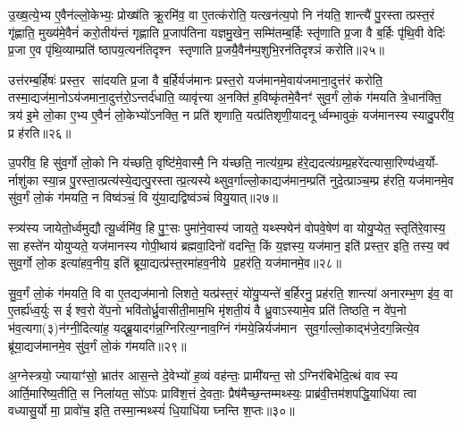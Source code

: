 उ॒ख्ष॒त्ये॒भ्य ए॒वैन॑ल्लो॒केभ्यः॒ प्रोख्ष॑ति क्रू॒रमि॑व॒ वा ए॒तत्क॑रोति॒ यत्खन॑त्य॒पो नि न॑यति॒ शान्त्यै॑ पु॒रस्तात्प्रस्त॒रं गृ॑ह्णाति॒ मुख्य॑मे॒वैनं॑ करो॒तीय॑न्तं गृह्णाति प्र॒जाप॑तिना यज्ञमु॒खेन॒ सम्मि॑तम्ब॒र्\mbox{}हिः स्तृ॑णाति प्र॒जा वै ब॒र्\mbox{}हिः पृ॑थि॒वी वेदिः॑ प्र॒जा ए॒व पृ॑थि॒व्याम्प्रति॑ ष्ठापय॒त्यन॑तिदृश्न स्तृणाति प्र॒जयै॒वैन॑म्प॒शुभि॒रन॑तिदृश्ञं करोति॥२५॥

उत्त॑रम्ब॒र्\mbox{}हिषः॑ प्रस्त॒र सा॑दयति प्र॒जा वै ब॒र्\mbox{}हिर्यज॑मानः प्रस्त॒रो यज॑मानमे॒वाय॑जमाना॒दुत्त॑रं करोति॒ तस्मा॒द्यज॑मा॒नोऽय॑जमाना॒दुत्त॑रो॒ऽन्तर्द॑धाति॒ व्यावृ॑त्त्या अ॒नक्ति॑ ह॒विष्कृ॑तमे॒वैनꣳ॑ सुव॒र्गं लो॒कं ग॑मयति त्रे॒धान॑क्ति॒ त्रय॑ इ॒मे लो॒का ए॒भ्य ए॒वैनं॑ लो॒केभ्यो॑ऽनक्ति॒ न प्रति॑ शृणाति॒ यत्प्र॑तिशृणी॒यादनूर्ध्वम्भावुकं॒ यज॑मानस्य स्यादु॒परी॑व॒ प्र ह॑रति॥२६॥

उ॒परी॑व॒ हि सु॑व॒र्गो लो॒को नि य॑च्छति॒ वृष्टि॑मे॒वास्मै॒ नि य॑च्छति॒ नात्य॑ग्र॒म्प्र ह॑रे॒द्यदत्य॑ग्रम्प्र॒हरे॑दत्यासा॒रिण्य॑ध्व॒र्यो- र्नाशु॑का स्या॒न्न पु॒रस्ता॒त्प्रत्य॑स्ये॒द्यत्पु॒रस्तात्प्र॒त्यस्येथ्सुव॒र्गाल्लो॒काद्यज॑मान॒म्प्रति॑ नुदे॒त्प्राञ्च॒म्प्र ह॑रति॒ यज॑मानमे॒व सु॑व॒र्गं लो॒कं ग॑मयति॒ न विष्व॑ञ्चं॒ वि यु॑या॒द्यद्विष्व॑ञ्चं वियु॒यात्॥२७॥

स्त्र्य॑स्य जायेतो॒र्ध्वमुद्यौत्यू॒र्ध्वमि॑व॒ हि पु॒ꣳ॒सः पुमा॑ने॒वास्य॑ जायते॒ यथ्स्फ्येन॑ वोपवे॒षेण॑ वा योयु॒प्येत॒ स्तृति॑रे॒वास्य॒ सा हस्ते॑न योयुप्यते॒ यज॑मानस्य गोपी॒थाय॑ ब्रह्मवा॒दिनो॑ वदन्ति॒ किं य॒ज्ञस्य॒ यज॑मान॒ इति॑ प्रस्त॒र इति॒ तस्य॒ क्व॑ सुव॒र्गो लो॒क इत्या॑हव॒नीय॒ इति॑ ब्रूया॒द्यत्प्र॑स्त॒रमा॑हव॒नीये प्र॒हर॑ति॒ यज॑मानमे॒व॥२८॥

सु॒व॒र्गं लो॒कं ग॑मयति॒ वि वा ए॒तद्यज॑मानो लिशते॒ यत्प्र॑स्त॒रं यो॑यु॒प्यन्ते॑ ब॒र्\mbox{}हिरनु॒ प्रह॑रति॒ शान्त्या॑ अनारम्भ॒ण इ॑व॒ वा ए॒तर्\mbox{}ह्य॑ध्व॒र्युः स ईश्व॒रो वे॑प॒नो भवि॑तोर्ध्रु॒वासीती॒माम॒भि मृ॑शती॒यं वै ध्रु॒वाऽस्यामे॒व प्रति॑ तिष्ठति॒ न वे॑प॒नो भ॑व॒त्यगा(३)न॑ग्नी॒दित्या॑ह॒ यद्ब्रू॒यादग॑न्न॒ग्निरित्य॒ग्नाव॒ग्निं ग॑मये॒न्निर्यज॑मान सुव॒र्गाल्लो॒काद्भ॑जे॒दग॒न्नित्ये॒व ब्रू॑या॒द्यज॑मानमे॒व सु॑व॒र्गं लो॒कं ग॑मयति॥२९॥

{\anuvakamend[{आ॒साद्य॒ प्रान॑तिदृश्ञं करोति हरति वियु॒याद्यज॑मानमे॒वाग्निरिति॑ स॒प्तद॑श च॥५॥}]}

अ॒ग्नेस्त्रयो॒ ज्यायाꣳ॑सो॒ भ्रात॑र आस॒न्ते दे॒वेभ्यो॑ ह॒व्यं वह॑न्तः॒ प्रामी॑यन्त॒ सोऽग्निर॑बिभेदि॒त्थं वाव स्य आर्ति॒मारि॑ष्य॒तीति॒ स निला॑यत॒ सो॑ऽपः प्रावि॑श॒त्तं दे॒वताः॒ प्रैष॑मैच्छ॒न्तम्मथ्स्यः॒ प्राब्र॑वी॒त्तम॑शपद्धि॒याधि॑या त्वा वध्यासु॒र्यो मा॒ प्रावो॑च॒ इति॒ तस्मा॒न्मथ्स्यं॑ धि॒याधि॑या घ्नन्ति श॒प्तः॥३०॥

